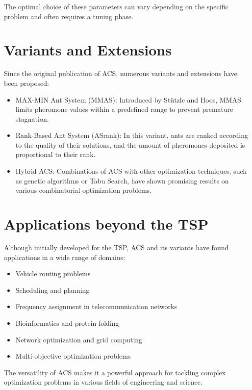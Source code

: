 The optimal choice of these parameters can vary depending on the specific problem and often requires a tuning phase.

\section{Variants and Extensions}

Since the original publication of \Gls{ACS}, numerous variants and extensions have been proposed:
\begin{itemize}
	\item MAX-MIN Ant System (\Gls{MMAS}): Introduced by Stützle and Hoos, \Gls{MMAS} limits pheromone values within a predefined range to prevent premature stagnation. \cite{Stuetzle1997}
	\item Rank-Based Ant System (\Gls{ASrank}): In this variant, ants are ranked according to the quality of their solutions, and the amount of pheromones deposited is proportional to their rank.
	\item Hybrid ACS: Combinations of ACS with other optimization techniques, such as genetic algorithms or Tabu Search, have shown promising results on various combinatorial optimization problems.
\end{itemize}

\section{Applications beyond the \Gls{TSP}}

Although initially developed for the \Gls{TSP}, \Gls{ACS} and its variants have found applications in a wide range of domains:

\begin{itemize}
	\item Vehicle routing problems
	\item Scheduling and planning
	\item Frequency assignment in telecommunication networks
	\item Bioinformatics and protein folding
	\item Network optimization and grid computing
	\item Multi-objective optimization problems
\end{itemize}

The versatility of \Gls{ACS} makes it a powerful approach for tackling complex optimization problems in various fields of engineering and science.
